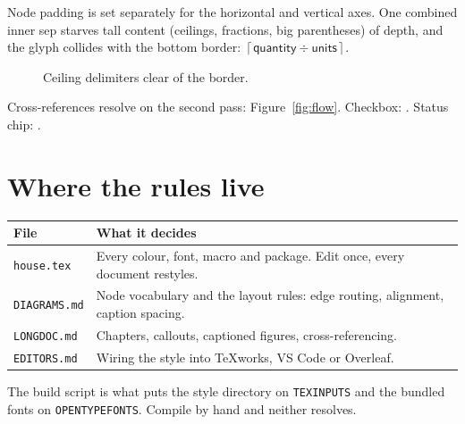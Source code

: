 \documentclass[11pt,a4paper,oneside]{report}
\begin{document}
Node padding is set separately for the horizontal and vertical axes. One
combined inner sep starves tall content (ceilings, fractions, big
parentheses) of depth, and the glyph collides with the bottom border:
$\left\lceil \textsf{quantity} \div \textsf{units} \right\rceil$.

\begin{figure}[H]
\centering
{}
\caption{Ceiling delimiters clear of the border.}
\end{figure}

Cross-references resolve on the second pass: Figure~\ref{fig:flow}. Checkbox:
\cb. Status chip: . 

\section{Where the rules live}

\begin{tabularx}{\linewidth}{@{}L{3.6cm} X@{}}
\toprule
\textbf{File} & \textbf{What it decides} \\
\midrule
{}
\texttt{house.tex}   & Every colour, font, macro and package. Edit once,
                       every document restyles. \\
\texttt{DIAGRAMS.md} & Node vocabulary and the layout rules: edge routing,
                       alignment, caption spacing. \\
\texttt{LONGDOC.md}  & Chapters, callouts, captioned figures,
                       cross-referencing. \\
\texttt{EDITORS.md}  & Wiring the style into TeXworks, VS Code or Overleaf. \\
\bottomrule
\end{tabularx}

\begin{houseinfo}
The build script is what puts the style directory on \texttt{TEXINPUTS} and the
bundled fonts on \texttt{OPENTYPEFONTS}. Compile by hand and neither resolves.
\end{houseinfo}
\end{document}
